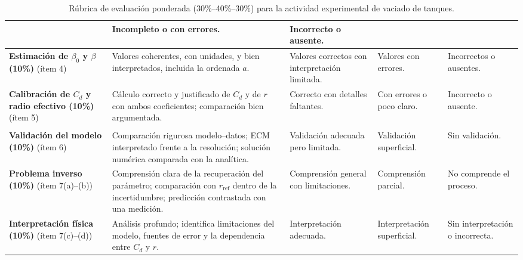 \documentclass[oneside,letter,spanish,activeacute,english,links,10pt]{amcaGCS_EDO}
\begin{document}
\begin{table}[H]
\begin{tabular}{|>{\raggedright\arraybackslash}p{2.6cm}|>{\raggedright\arraybackslash}p{4.9cm}|>{\raggedright\arraybackslash}p{2.5cm}|>{\raggedright\arraybackslash}p{1.8cm}|>{\raggedright\arraybackslash}p{2.0cm}|}
		& Incompleto o con errores.
		& Incorrecto o ausente. \\
		\hline
		\textbf{Estimación de $\beta_0$ y $\beta$ (10\%)} \newline (ítem 4)
		& Valores coherentes, con unidades, y bien interpretados, incluida la ordenada $a$.
		& Valores correctos con interpretación limitada.
		& Valores con errores.
		& Incorrectos o ausentes. \\
		\hline
		\textbf{Calibración de $C_d$ y radio efectivo (10\%)}  (ítem 5)
		& Cálculo correcto y justificado de $C_d$ y de $r$ con ambos coeficientes; comparación bien argumentada.
		& Correcto con detalles faltantes.
		& Con errores o poco claro.
		& Incorrecto o ausente. \\
		\hline
		\multicolumn{5}{|c|}{\textbf{III. Interpretación y validación (30\%)}} \\
		\hline
		\textbf{Validación del modelo (10\%)} \newline (ítem 6)
		& Comparación rigurosa modelo--datos; ECM interpretado frente a la resolución; solución numérica comparada con la analítica.
		& Validación adecuada pero limitada.
		& Validación superficial.
		& Sin validación. \\
		\hline
		\textbf{Problema inverso (10\%)} \newline (ítem 7(a)--(b))
		& Comprensión clara de la recuperación del parámetro; comparación con $r_{\mathrm{ref}}$ dentro de la incertidumbre; predicción contrastada con una medición.
		& Comprensión general con limitaciones.
		& Comprensión parcial.
		& No comprende el proceso. \\
		\hline
		\textbf{Interpretación física (10\%)} \newline (ítem 7(c)--(d))
		& Análisis profundo; identifica limitaciones del modelo, fuentes de error y la dependencia entre $C_d$ y $r$.
		& Interpretación adecuada.
		& Interpretación superficial.
		& Sin interpretación o incorrecta. \\
		\hline
	\end{tabular}
	\caption{Rúbrica de evaluación ponderada (30\%--40\%--30\%) para la actividad experimental de vaciado de tanques.}
	\label{tab:rubrica}
\end{table}
\end{document}
